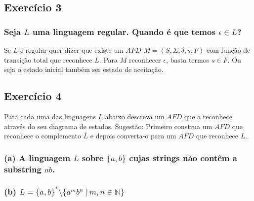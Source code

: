 \documentclass{article}
\begin{document}
\subsection*{Exercício 3}
\subsubsection*{Seja $L$ uma linguagem regular. Quando é que temos $\epsilon \in L$?}

Se $L$ é regular quer dizer que existe um $AFD$ $M = (S,\Sigma,\delta,s,F)$ com função de transição total que reconhece $L$. Para $M$ reconhecer $\epsilon$, basta termos $s \in F$. Ou seja o estado inicial também ser estado de aceitação.

\subsection*{Exercício 4}
Para cada uma das linguagens $L$ abaixo descreva um $AFD$ que a reconhece através do seu diagrama de estados. Sugestão: Primeiro construa um $AFD$ que reconhece o complemento $\overline{L}$ e depois converta-o para um $AFD$ que reconhece $L$.
\subsubsection*{(a) A linguagem $L$ sobre $\{a, b\}$ cujas strings não contêm a substring $ab$.}

\begin{center}
\end{center}

\subsubsection*{(b) $L = \{a, b\}^\ast \setminus \{a^{m}b^n \ | \ m, n \in \mathbb{N}\}$}

\begin{center}
\end{center}
\end{document}
